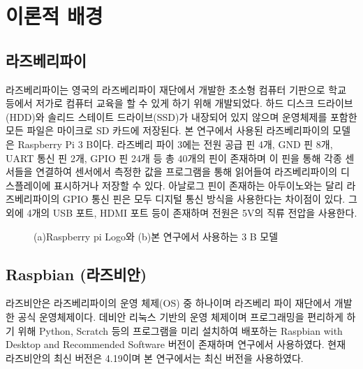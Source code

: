 \section{이론적 배경}

\subsection{라즈베리파이}

라즈베리파이는 영국의 라즈베리파이 재단에서 개발한 초소형 컴퓨터 기판으로 학교 등에서 저가로 컴퓨터 교육을 할 수 있게 하기 위해 개발되었다. 하드 디스크 드라이브(HDD)와 솔리드 스테이트 드라이브(SSD)가 내장되어 있지 않으며 운영체제를 포함한 모든 파일은 마이크로 SD 카드에 저장된다. 본 연구에서 사용된 라즈베리파이의 모델은 Raspberry Pi 3 B이다. 라즈베리 파이 3에는 전원 공급 핀 4개, GND 핀 8개, UART 통신 핀 2개, GPIO 핀 24개 등 총 40개의 핀이 존재하며 이 핀을 통해 각종 센서들을 연결하여 센서에서 측정한 값을 프로그램을 통해 읽어들여 라즈베리파이의 디스플레이에 표시하거나 저장할 수 있다. 아날로그 핀이 존재하는 아두이노와는 달리 라즈베리파이의 GPIO 통신 핀은 모두 디지털 통신 방식을 사용한다는 차이점이 있다. 그 외에 4개의 USB 포트, HDMI 포트 등이 존재하며 전원은 5V의 직류 전압을 사용한다.

\begin{figure}[htbp]
	\begin{center}
		\caption{(a)Raspberry pi Logo와 (b)본 연구에서 사용하는 3 B 모델}
		\label{RASPI}
	\end{center}
\end{figure}


\subsection{Raspbian (라즈비안)}
라즈비안은 라즈베리파이의 운영 체제(OS) 중 하나이며 라즈베리 파이 재단에서 개발한 공식 운영체제이다. 데비안 리눅스 기반의 운영 체제이며 프로그래밍을 편리하게 하기 위해 Python, Scratch 등의 프로그램을 미리 설치하여 배포하는 Raspbian with Desktop and Recommended Software 버전이 존재하며 연구에서 사용하였다. 현재 라즈비안의 최신 버전은 4.19이며 본 연구에서는 최신 버전을 사용하였다.

